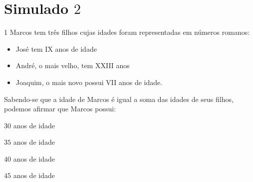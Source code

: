 

\section*{Simulado $2$}

\num{1}  Marcos tem três filhos cujas idades foram representadas em números
romanos:

\begin{itemize}
\item
  José tem IX anos de idade
\item
  André, o mais velho, tem XXIII anos
\item
  Joaquim, o mais novo possui VII anos de idade.
\end{itemize}

Sabendo-se que a idade de Marcos é igual a soma das idades de seus
filhos, podemos afirmar que Marcos possui:

\begin{escolha}
\item $30$ anos de idade
\item $35$ anos de idade
\item $40$ anos de idade
\item $45$ anos de idade
\end{escolha}

